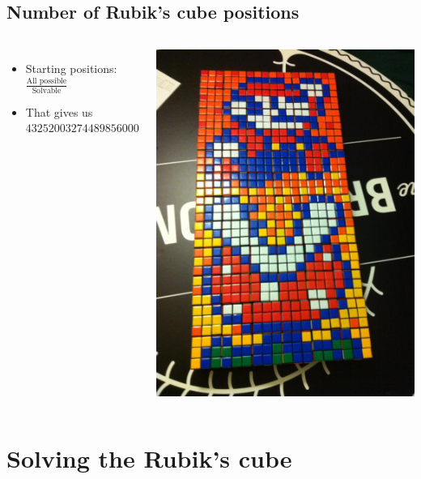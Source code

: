 \documentclass[xcolor=pdftex,dvipsnames,table]{beamer}
\begin{document}
\subsection{Number of Rubik's cube positions}
\begin{frame}
  \begin{columns}[cc]
    \column{1.5in}
  \begin{itemize}
    \item Starting positions: $\frac{\text{All possible}}{\text{Solvable}}$
    \item That gives us $43252003274489856000$
  \end{itemize}
  \column{1.5in}
    \includegraphics[scale=0.2]{supermario.jpg}
  \end{columns}
\end{frame}

\section{Solving the Rubik's cube}
\end{document}
